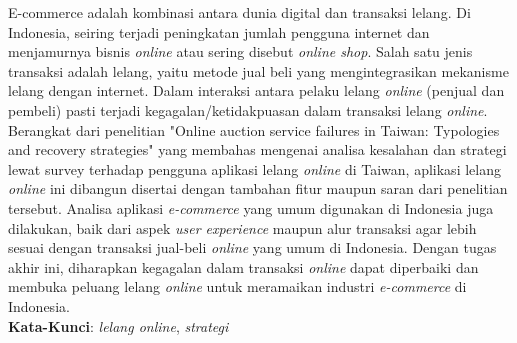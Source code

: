 \begin{abstrak}
		E-commerce adalah kombinasi antara dunia digital dan transaksi lelang. Di Indonesia, seiring terjadi peningkatan jumlah pengguna internet dan menjamurnya bisnis \textit{online} atau sering disebut \textit{online shop}. Salah satu jenis transaksi adalah lelang, yaitu metode jual beli yang mengintegrasikan mekanisme lelang dengan internet.
	    \newline
	    \indent Dalam interaksi antara pelaku lelang \textit{online} (penjual dan pembeli) pasti terjadi kegagalan/ketidakpuasan dalam transaksi lelang \textit{online}. Berangkat dari penelitian "Online auction service failures in   {Taiwan}: {Typologies} and recovery strategies" yang membahas mengenai analisa kesalahan dan strategi lewat survey terhadap pengguna aplikasi lelang \textit{online} di Taiwan, aplikasi lelang \textit{online} ini dibangun disertai dengan tambahan fitur maupun saran dari penelitian tersebut.
	    \newline 
	    \indent Analisa aplikasi \textit{e-commerce} yang umum digunakan di Indonesia juga dilakukan, baik dari aspek \textit{user experience} maupun alur transaksi agar lebih sesuai dengan transaksi jual-beli \textit{online} yang umum di Indonesia. Dengan tugas akhir ini, diharapkan kegagalan dalam transaksi \textit{online} dapat diperbaiki dan membuka peluang lelang \textit{online} untuk meramaikan industri \textit{e-commerce} di Indonesia.\\
\noindent \textbf{Kata-Kunci}: \textit{lelang online}, \textit{strategi }
\end{abstrak}